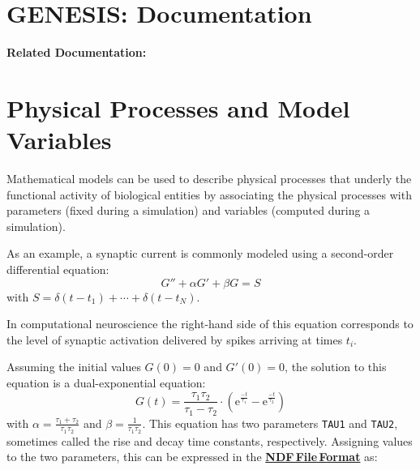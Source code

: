 \documentclass[12pt]{article}
\begin{document}
\section*{GENESIS: Documentation}

{\bf Related Documentation:}

\section*{Physical Processes and Model Variables}

Mathematical models can be used to describe physical processes that underly the functional activity
of biological entities by associating the physical
processes with parameters (fixed during a simulation) and variables
(computed during a simulation).

As an example, a synaptic current is commonly modeled using a
second-order differential equation:
\begin{equation}
  \label{eq:second-order-synchan}
  G'' + \alpha G' + \beta G = S
\end{equation}
with $S = \delta(t - t_1) + \cdots + \delta(t - t_N)$.

In computational neuroscience the right-hand side of this equation
corresponds to the level of synaptic activation delivered by spikes
arriving at times $t_i$.

Assuming the initial values $G(0) = 0$ and $G'(0) = 0$, the solution
to this equation is a dual-exponential equation:
\begin{equation}
  \label{eq:dual-exponential}
  G(t) = \frac{\tau_1\tau_2}{\tau_1 - \tau_2}
  \cdot (\mathrm{e}^{\frac{-t}{\tau_1}} - \mathrm{e}^{\frac{-t}{\tau_2}})
\end{equation}
with $\alpha = \frac{\tau_1 + \tau_2}{\tau_1 \tau_2}$ and $\beta =
\frac{1}{\tau_1 \tau_2}$.
This equation has two parameters {\tt TAU1} and {\tt TAU2}, sometimes
called the rise and decay time constants, respectively.  Assigning
values to the two parameters, this can be expressed in the \href{../ndf-file-format/ndf-file-format.tex}{\bf NDF\,File\,Format}
as:
\end{document}
